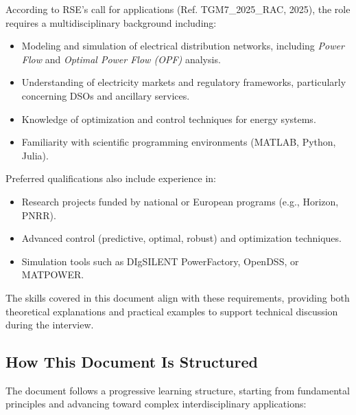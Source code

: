 \documentclass[11pt]{article}
\begin{document}
	According to RSE’s call for applications (Ref. TGM7\_2025\_RAC, 2025), the role requires a multidisciplinary background including:
	\begin{itemize}
		\item Modeling and simulation of electrical distribution networks, including \textit{Power Flow} and \textit{Optimal Power Flow (OPF)} analysis.
		\item Understanding of electricity markets and regulatory frameworks, particularly concerning DSOs and ancillary services.
		\item Knowledge of optimization and control techniques for energy systems.
		\item Familiarity with scientific programming environments (MATLAB, Python, Julia).
	\end{itemize}
	
	Preferred qualifications also include experience in:
	\begin{itemize}
		\item Research projects funded by national or European programs (e.g., Horizon, PNRR).
		\item Advanced control (predictive, optimal, robust) and optimization techniques.
		\item Simulation tools such as DIgSILENT PowerFactory, OpenDSS, or MATPOWER.
	\end{itemize}
	
	The skills covered in this document align with these requirements, providing both theoretical explanations and practical examples to support technical discussion during the interview.
	
	\subsection*{How This Document Is Structured}
	
	The document follows a progressive learning structure, starting from fundamental principles and advancing toward complex interdisciplinary applications:
	
\end{document}
